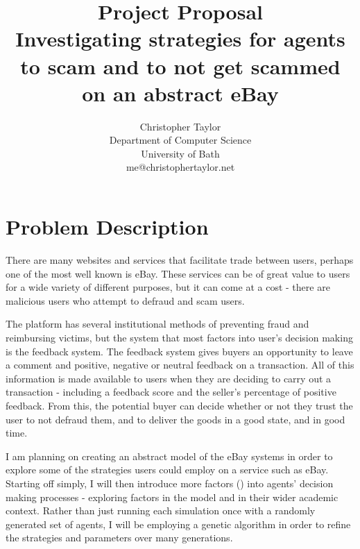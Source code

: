 \documentclass{article}
\title{Project Proposal \\ Investigating strategies for agents to scam and to not get scammed on an abstract eBay}
\author{Christopher Taylor \\ Department of Computer Science \\ University of Bath \\ me@christophertaylor.net}
\begin{document}
\maketitle

\section{Problem Description}
\label{sec:problem-description}
There are many websites and services that facilitate trade between users, perhaps one of the most well known is eBay. These services can be of great value to users for a wide variety of different purposes, but it can come at a cost - there are malicious users who attempt to defraud and scam users.

The platform has several institutional methods of preventing fraud and reimbursing victims, but the system that most factors into user's decision making is the feedback system. The feedback system gives buyers an opportunity to leave a comment and positive, negative or neutral feedback on a transaction. All of this information is made available to users when they are deciding to carry out a transaction - including a feedback score and the seller's percentage of positive feedback. From this, the potential buyer can decide whether or not they trust the user to not defraud them, and to deliver the goods in a good state, and in good time.\cite{gregg2006role}

I am planning on creating an abstract model of the eBay systems in order to explore some of the strategies users could employ on a service such as eBay. Starting off simply, I will then introduce more factors () into agents' decision making processes - exploring factors in the model and in their wider academic context. Rather than just running each simulation once with a randomly generated set of agents, I will be employing a genetic algorithm in order to refine the strategies and parameters over many generations.
\end{document}
